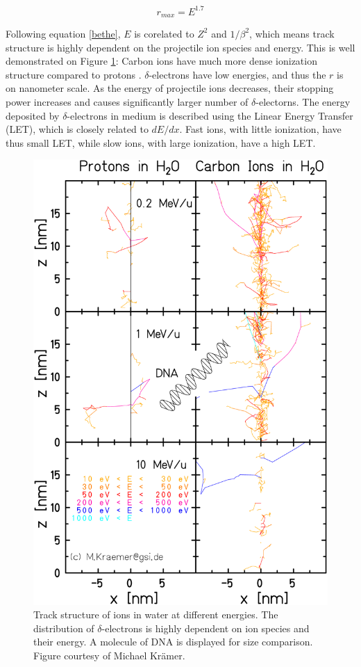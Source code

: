 \documentclass[type=dr, dr=rernat, accentcolor=tud7b,colorbacktitle, bigchapter, openright, twoside, 12pt ]{tudthesis}
\begin{document}
\begin{equation}
 r_{max} = E^{1.7}
\end{equation}

Following equation \ref{bethe}, $E$ is corelated to $Z^2$ and $1/\beta^2$, which means track structure is highly dependent on the projectile ion species and energy. This is well demonstrated on Figure \ref{track}:
Carbon ions have much more dense ionization structure compared to protons \cite{!!}. $\delta$-electrons have low energies, and thus the $r$ is on nanometer scale. As the energy of projectile ions decreases, their
stopping power increases and causes significantly larger number of $\delta$-electorns. The energy deposited by $\delta$-electrons in medium is described using the Linear Energy Transfer (LET), which is closely related to 
$dE/dx$. Fast ions, with little ionization, have thus small LET, while slow ions, with large ionization, have a high LET.


\begin{figure}[H]
\begin{center}
\includegraphics[scale=0.25]{./Images/trackstructure.png}
\caption{Track structure of ions in water at different energies. The distribution of $\delta$-electrons is highly dependent on ion species and their energy.
A molecule of DNA is displayed for size comparison. Figure courtesy of Michael Kr\"amer.}
\label{track}
\end{center}
\end{figure}
\end{document}
